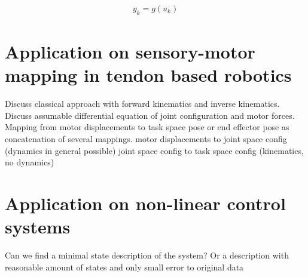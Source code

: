 \documentclass[a4paper, 10pt]{article}
\begin{document}
\begin{align*}
y_k=g(u_k)
\end{align*}

\section*{Application on sensory-motor mapping in tendon based robotics}

Discuss classical approach with forward kinematics and inverse kinematics.
Discuss assumable differential equation of joint configuration and motor forces.
Mapping from motor displacements to task space pose or end effector pose as concatenation of several mappings.
motor displacements to joint space config (dynamics in general possible)
joint space config to task space config (kinematics, no dynamics)

\section*{Application on non-linear control systems}
    
Can we find a minimal state description of the system?
Or a description with reasonable amount of states and only small error to original data
\end{document}
